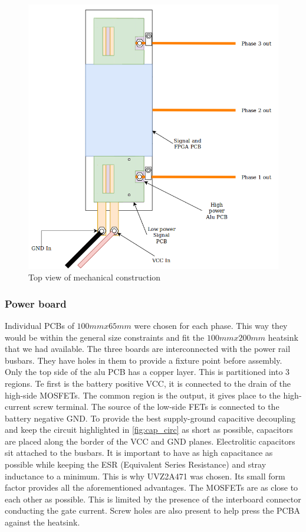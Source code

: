 \begin{figure}[H]
	\centering
	\includegraphics[width=1\textwidth]{pictures/hardware/Power_Board/mechanical_top_new.png}
	\caption{Top view of mechanical construction}
	\label{fig:mech_top}
\end{figure}



\subsubsection{Power board}

Individual PCBs of $100mm x 65mm$ were chosen for each phase. This way they would be within the general size constraints and fit the $100mm x 200mm$ heatsink that we had available. The three boards are interconnected with the power rail busbars. They have holes in them to provide a fixture point before assembly. Only the top side of the alu PCB has a copper layer. This is partitioned into 3 regions. Te first is the battery positive VCC, it is connected to the drain of the high-side MOSFETs. The common region is the output, it gives place to the high-current screw terminal. The source of the low-side FETs is connected to the battery negative GND. To provide the best supply-ground capacitive decoupling and keep the circuit highlighted in \ref{fig:cap_circ} as short as possible, capacitors are placed along the border of the VCC and GND planes. Electrolitic capacitors sit attached to the busbars. It is important to have as high capacitance as possible while keeping the ESR (Equivalent Series Resistance) and stray inductance to a minimum. This is why UVZ2A471\cite{elco} was chosen. Its small form factor provides all the aforementioned advantages. The MOSFETs are as close to each other as possible. This is limited by the presence of the interboard connector conducting the gate current. Screw holes are also present to help press the PCBA against the heatsink.

